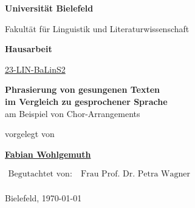 \begin{center}

\Huge{\textbf{Universität Bielefeld}}

\LARGE{Fakultät für Linguistik und Literaturwissenschaft}

\vfill

\LARGE{\textbf{Hausarbeit}}

\Large

\href{https://ekvv.uni-bielefeld.de/sinfo/publ/modul/26797308}{23-LIN-BaLinS2}

\vfill


\vspace*{1cm}

\LARGE{\textbf{Phrasierung von gesungenen Texten\\im Vergleich zu gesprochener Sprache}\\am Beispiel von Chor-Arrangements}

\Large

\vfill

vorgelegt von

\vspace*{1cm}

\textbf{\href{https://fabianwohlgemuth.de}{Fabian Wohlgemuth}}

\vfill

$\begin{aligned}
\text{Begutachtet von:}&\ \text{Frau Prof. Dr. Petra Wagner}\\
\end{aligned}$

\vfill

Bielefeld, \today
{}

\end{center}
\restoregeometry